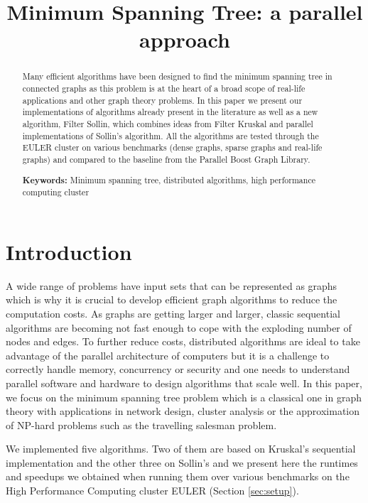 \documentclass[letterpaper]{article}
\title{Minimum Spanning Tree: a parallel approach}
\begin{document}
%
\maketitle
%


\begin{abstract}

Many efficient algorithms have been designed to find the minimum spanning tree in connected graphs as this problem is at the heart of a broad scope of real-life applications and other graph theory problems. 
In this paper we present our implementations of algorithms already present in the literature as well as a new algorithm, Filter Sollin, which combines ideas from Filter Kruskal and parallel implementations of Sollin's algorithm. All the algorithms are tested through the EULER cluster on various benchmarks (dense graphs, sparse graphs and real-life graphs) and compared to the baseline from the Parallel Boost Graph Library.

\textbf{Keywords:} Minimum spanning tree, distributed algorithms, high performance computing cluster 


\end{abstract}

\section{Introduction}\label{sec:intro}

A wide range of problems have input sets that can be represented as graphs which is why it is crucial to develop efficient graph algorithms to reduce the computation costs. As graphs are getting larger and larger, classic sequential algorithms are becoming not fast enough to cope with the exploding number of nodes and edges. To further reduce costs, distributed algorithms are ideal to take advantage of the parallel architecture of computers but it is a challenge to correctly handle memory, concurrency or security and one needs to understand parallel software and hardware to design algorithms that scale well.
In this paper, we focus on the minimum spanning tree problem which is a classical one in graph theory with applications in network design, cluster analysis or the approximation of NP-hard problems such as the travelling salesman problem. 

We implemented five algorithms. Two of them are based on Kruskal's sequential implementation and the other three on Sollin's and we present here the runtimes and speedups we obtained when running them over various benchmarks on the High Performance Computing cluster EULER (Section \ref{sec:setup}). 
\end{document}
